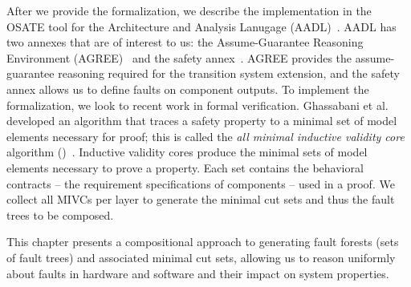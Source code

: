 After we provide the formalization, we describe the implementation in the OSATE tool for the Architecture and Analysis Lanugage (AADL)~\cite{FeilerModelBasedEngineering2012}. AADL has two annexes that are of interest to us: the Assume-Guarantee Reasoning Environment (AGREE)~\cite{NFM2012:CoGaMiWhLaLu} and the safety annex~\cite{stewart2020safety}. AGREE provides the assume-guarantee reasoning required for the transition system extension, and the safety annex allows us to define faults on component outputs. To implement the formalization, we look to recent work in formal verification. Ghassabani et al. developed an algorithm that traces a safety property to a minimal set of model elements necessary for proof; this is called the \textit{all minimal inductive validity core} algorithm (\aivcalg)~\cite{GhassabaniGW16,Ghassabani2017EfficientGO}. Inductive validity cores produce the minimal sets of model elements necessary to prove a property. Each set contains the behavioral contracts -- the requirement specifications of components -- used in a proof. We collect all MIVCs per layer to generate the minimal cut sets and thus the fault trees to be composed.


This chapter presents a compositional approach to generating fault forests (sets of fault trees) and associated minimal cut sets, allowing us to reason uniformly about faults in hardware and software and their impact on system properties. 






